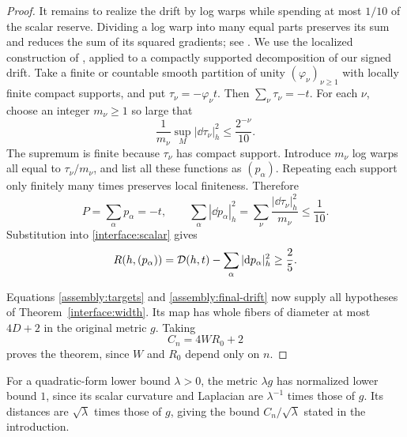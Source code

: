 \begin{proof}
It remains to realize the drift by log warps while spending at most
$1/10$ of the scalar reserve.  Dividing a log warp into many equal
parts preserves its sum and reduces the sum of its squared gradients;
see \cite[Section~1.A]{Gromov2024}.  We use the localized construction
of \cite[Theorem~4.3]{OpenAIWidth}, applied to a compactly supported
decomposition of our signed drift.  Take a finite or countable smooth
partition of unity $(\varphi_\nu)_{\nu\ge1}$ with locally finite
compact supports, and put $\tau_\nu=-\varphi_\nu t$.  Then
$\sum_\nu\tau_\nu=-t$.  For each $\nu$, choose an integer $m_\nu\ge1$
so large that
\[
 \frac{1}{m_\nu}\sup_M|\dd\tau_\nu|_h^2
          \le\frac{2^{-\nu}}{10}.
\]
The supremum is finite because $\tau_\nu$ has compact support.
Introduce $m_\nu$ log warps all equal to $\tau_\nu/m_\nu$, and list
all these functions as $(p_\alpha)$.  Repeating each support only
finitely many times preserves local finiteness.  Therefore
\[
 P=\sum_\alpha p_\alpha=-t,
 \qquad
 \sum_\alpha|\dd p_\alpha|_h^2
   =\sum_\nu\frac{|\dd\tau_\nu|_h^2}{m_\nu}\le\frac1{10}.
\]
Substitution into \eqref{interface:scalar} gives
\[
 R(h,(p_\alpha))
 =\mathcal D(h,t)-\sum_\alpha|\mathrm d p_\alpha|_h^2
 \ge\frac25.
\]

Equations \eqref{assembly:targets} and \eqref{assembly:final-drift}
now supply all hypotheses of Theorem~\ref{interface:width}.  Its map
has whole fibers of diameter at most $4D+2$ in the original metric
$g$.  Taking
\[
 C_n=4WR_0+2
\]
proves the theorem, since $W$ and $R_0$ depend only on $n$.
\end{proof}

For a quadratic-form lower bound $\lambda>0$, the metric $\lambda g$
has normalized lower bound $1$, since its scalar curvature and
Laplacian are $\lambda^{-1}$ times those of $g$.  Its distances are
$\sqrt\lambda$ times those of $g$, giving the bound
$C_n/\sqrt\lambda$ stated in the introduction.
